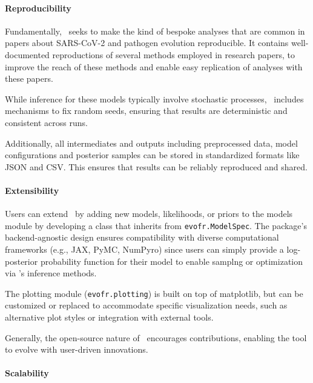 \paragraph{Reproducibility}

Fundamentally, \evofr\ seeks to make the kind of bespoke analyses that are common in papers about SARS-CoV-2 and pathogen evolution reproducible.
It contains well-documented reproductions of several methods employed in research papers, to improve the reach of these methods and enable easy replication of analyses with these papers.

While inference for these models typically involve stochastic processes, \evofr\ includes mechanisms to fix random seeds, ensuring that results are deterministic and consistent across runs.

Additionally, all intermediates and outputs including preprocessed data, model configurations and posterior samples can be stored in standardized formats like JSON and CSV.
This ensures that results can be reliably reproduced and shared.

\paragraph{Extensibility}

Users can extend \evofr\ by adding new models, likelihoods, or priors to the models module by developing a class that inherits from \texttt{evofr.ModelSpec}.
The package’s backend-agnostic design ensures compatibility with diverse computational frameworks (e.g., JAX, PyMC, NumPyro) since users can simply provide a log-posterior probability function for their model to enable samplng or optimization via \evofr's inference methods. \cite{jax2018github, AbrilPla2023, phan2019composable}

The plotting module (\texttt{evofr.plotting}) is built on top of matplotlib, but can be customized or replaced to accommodate specific visualization needs, such as alternative plot styles or integration with external tools. \cite{Hunter2007}

Generally, the open-source nature of \evofr\ encourages contributions, enabling the tool to evolve with user-driven innovations.

\paragraph{Scalability}

